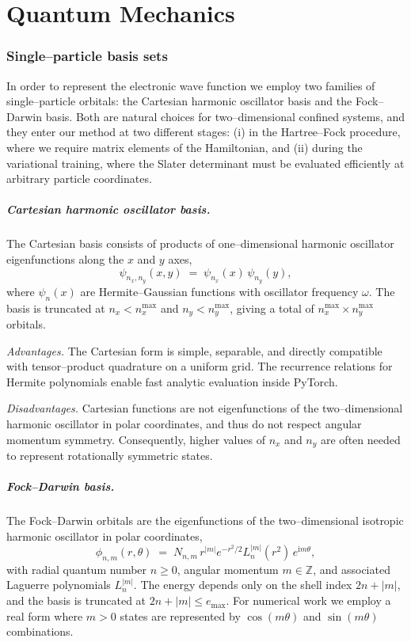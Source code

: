 \graphicspath{{../results/figures/methods/}}
\chapter{Quantum Mechanics}
\subsection{Single--particle basis sets}

In order to represent the electronic wave function we employ two families of single--particle orbitals: the Cartesian harmonic oscillator basis and the Fock--Darwin basis. Both are natural choices for two--dimensional confined systems, and they enter our method at two different stages: (i) in the Hartree--Fock procedure, where we require matrix elements of the Hamiltonian, and (ii) during the variational training, where the Slater determinant must be evaluated efficiently at arbitrary particle coordinates.

\paragraph{Cartesian harmonic oscillator basis.}
The Cartesian basis consists of products of one--dimensional harmonic oscillator eigenfunctions along the $x$ and $y$ axes,
\[
\psi_{n_x,n_y}(x,y) \;=\; \psi_{n_x}(x)\,\psi_{n_y}(y),
\]
where $\psi_{n}(x)$ are Hermite--Gaussian functions with oscillator frequency $\omega$. The basis is truncated at $n_x < n_x^{\max}$ and $n_y < n_y^{\max}$, giving a total of $n_x^{\max}\times n_y^{\max}$ orbitals. 

\emph{Advantages.} 
The Cartesian form is simple, separable, and directly compatible with tensor--product quadrature on a uniform grid. The recurrence relations for Hermite polynomials enable fast analytic evaluation inside PyTorch.  

\emph{Disadvantages.} 
Cartesian functions are not eigenfunctions of the two--dimensional harmonic oscillator in polar coordinates, and thus do not respect angular momentum symmetry. Consequently, higher values of $n_x$ and $n_y$ are often needed to represent rotationally symmetric states.

\paragraph{Fock--Darwin basis.}
The Fock--Darwin orbitals are the eigenfunctions of the two--dimensional isotropic harmonic oscillator in polar coordinates,
\[
\phi_{n,m}(r,\theta) \;=\; N_{n,m}\, r^{|m|} e^{-r^2/2} L_{n}^{|m|}(r^2)\, e^{\mathrm{i} m \theta},
\]
with radial quantum number $n\ge 0$, angular momentum $m\in\mathbb{Z}$, and associated Laguerre polynomials $L_n^{|m|}$. The energy depends only on the shell index $2n+|m|$, and the basis is truncated at $2n+|m| \leq e_{\max}$. For numerical work we employ a real form where $m>0$ states are represented by $\cos(m\theta)$ and $\sin(m\theta)$ combinations. 

